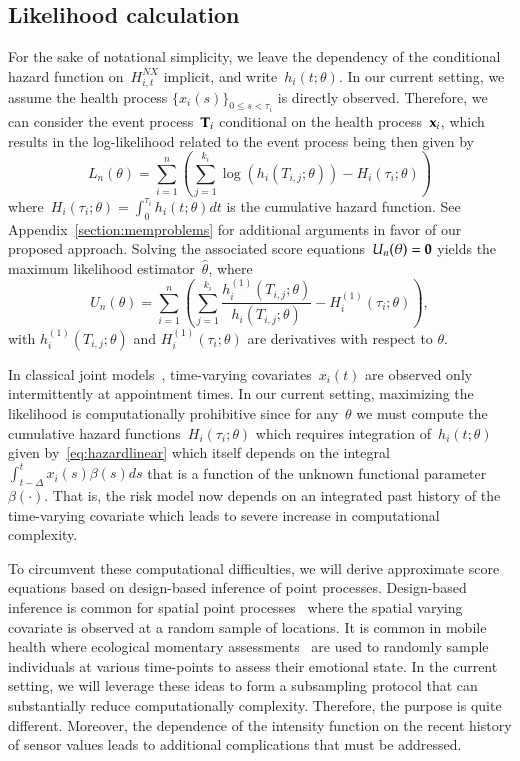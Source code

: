 \documentclass[12pt]{amsart}
\newtheorem{rmk}[thm]{Remark}%
\def\bfx{{\bf x}}
\def\bfT{{\bf T}}
\begin{document}
\subsection{Likelihood calculation}

For the sake of notational simplicity, we leave the dependency of the conditional hazard function on~$H_{i,t}^{NX}$ implicit, and write~$h_i (t; \theta)$. In our current setting, we assume the health process $\{ x_i(s)\}_{0 \leq s < \tau_i}$ is directly observed.  Therefore, we can consider the event process~$\bfT_i$ conditional on the health process~$\bfx_i$, which results in the log-likelihood related to the event process being then given by
\[
  L_n (\theta) = \sum_{i=1}^{n} \left ( \sum_{j=1}^{k_i}
    \log \left( h_i \left( T_{i,j}; \theta
      \right) \right) - H_{i} \left( \tau_i; \theta \right) \right)
\]
where~$H_{i} (\tau_i ; \theta) = \int_{0}^{\tau_i} h_{i} (t; \theta) dt$ is the cumulative hazard function. See Appendix~\ref{section:memproblems} for additional arguments in favor of our proposed approach. Solving the associated score equations~$U_n (\theta) = {\bf 0}$ yields the maximum likelihood estimator~$\hat \theta$, where
\[
U_n (\theta) = \sum_{i=1}^{n} \left ( \sum_{j=1}^{k_i} \frac{h^{(1)}_i
    (T_{i,j}; \theta)}{h_i (T_{i,j}; \theta)} - H^{(1)}_{i} (\tau_i;
  \theta) \right),
\]
with $h_i^{(1)} (T_{i,j}; \theta)$ and $H_i^{(1)} (\tau_{i}; \theta)$ are derivatives with respect to $\theta$.

In classical joint models~\citep{Henderson2000, Tsiatis2004}, time-varying covariates~$x_i (t)$ are observed only intermittently at appointment times. In our current setting, maximizing the likelihood is computationally prohibitive since for any~$\theta$ we must compute the cumulative hazard functions~$H_{i} (\tau_i; \theta)$ which requires integration of~$h_i(t;\theta)$ given by~\eqref{eq:hazardlinear} which itself depends on the integral~$\int_{t-\Delta}^t x_i (s) \beta(s) ds$ that is a function of the unknown functional parameter $\beta(\cdot)$.  That is, the risk model now depends on an integrated past history of the time-varying covariate which leads to severe increase in computational complexity.

To circumvent these computational difficulties, we will derive approximate score equations based on design-based inference of point processes.  Design-based inference is common for spatial point processes~\citep{Waagepetersen2008} where the spatial varying covariate is observed at a random sample of locations. It is common in mobile health where ecological momentary assessments~\citep{Rathbun2012,Rathbun2016} are used to randomly sample individuals at various time-points to assess their emotional state.  In the current setting, we will leverage these ideas to form a subsampling protocol that can substantially reduce computationally complexity.  Therefore, the purpose is quite different. Moreover, the dependence of the intensity function on the recent history of sensor values leads to additional complications that must be addressed.
\end{document}
